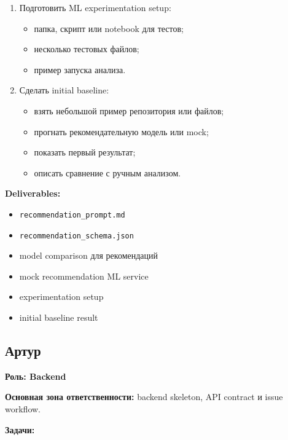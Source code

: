 \documentclass[12pt,a4paper]{article}
\begin{document}
\begin{enumerate}
    \item Подготовить ML experimentation setup:
    \begin{itemize}
        \item папка, скрипт или notebook для тестов;
        \item несколько тестовых файлов;
        \item пример запуска анализа.
    \end{itemize}

    \item Сделать initial baseline:
    \begin{itemize}
        \item взять небольшой пример репозитория или файлов;
        \item прогнать рекомендательную модель или mock;
        \item показать первый результат;
        \item описать сравнение с ручным анализом.
    \end{itemize}
\end{enumerate}

\textbf{Deliverables:}
\begin{itemize}
    \item \texttt{recommendation\_prompt.md}
    \item \texttt{recommendation\_schema.json}
    \item model comparison для рекомендаций
    \item mock recommendation ML service
    \item experimentation setup
    \item initial baseline result
\end{itemize}

\subsection{Артур}

\textbf{Роль: Backend}

\textbf{Основная зона ответственности:} backend skeleton, API contract и issue workflow.

\textbf{Задачи:}
\end{document}
